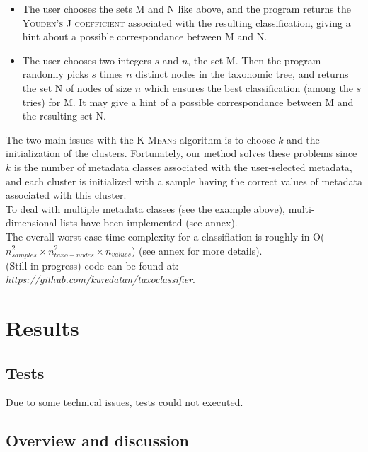 \documentclass{report}
\begin{document}
\begin{itemize}
\item The user chooses the sets \textsc{M} and \textsc{N} like above, and the program returns the \textsc{Youden’s J coefficient} associated with the resulting classification, giving a hint about a possible correspondance between \textsc{M} and \textsc{N}.
\item The user chooses two integers $s$ and $n$, the set \textsc{M}. Then the program randomly picks $s$ times $n$ distinct nodes in the taxonomic tree, and returns the set \textsc{N} of nodes of size $n$ which ensures the best classification (among the $s$ tries) for M. It may give a hint of a possible correspondance between \textsc{M} and the resulting set \textsc{N}.
\end{itemize}

The two main issues with the \textsc{K-Means} algorithm is to choose $k$ and the initialization of the clusters. Fortunately, our method solves these problems since $k$ is the number of metadata classes associated with the user-selected metadata, and each cluster is initialized with a sample having the correct values of metadata associated with this cluster.\\

To deal with multiple metadata classes (see the example above), multi-dimensional lists have been implemented (see annex).\\

The overall worst case time complexity for a classifiation is roughly in O($n_{samples}^{2} \times n_{taxo-nodes}^{2} \times n_{values}$) (see annex for more details).\\

(Still in progress) code can be found at:\\ \emph{https://github.com/kuredatan/taxoclassifier}.

\section{Results}

\subsection{Tests}

Due to some technical issues, tests could not executed.\\

\subsection{Overview and discussion}
\end{document}
